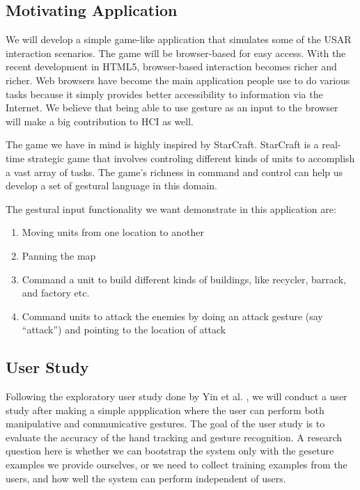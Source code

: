 \subsection{Motivating Application}
We will develop a simple game-like application that simulates some of the USAR
interaction scenarios. The game will be browser-based for easy access. With the
recent development in HTML5, browser-based interaction becomes richer and
richer. Web browsers have become the main application people use to do various
tasks because it simply provides better accessibility to information via the
Internet. We believe that being able to use gesture as an input to the browser
will make a big contribution to HCI as well.

The game we have in mind is highly inspired by StarCraft. StarCraft is a
real-time strategic game that involves controling different kinds of units to
accomplish a vast array of tasks. The game's richness in command
and control can help us develop a set of gestural language in this domain.

The gestural input functionality we want demonstrate in this application are:

\begin{enumerate}
  \item Moving units from one location to another
  \item Panning the map
  \item Command a unit to build different kinds of buildings, like recycler,
  barrack, and factory etc.
  \item Command units to attack the enemies by doing an attack gesture (say
  ``attack'') and pointing to the location of attack
\end{enumerate}

\subsection{User Study}\label{sec:userStudy}
Following the exploratory user study done by Yin et al. \cite{yin10}, we will
conduct a user study after making a simple appplication where the user can
perform both manipulative and communicative gestures. The goal of the user study
is to evaluate the accuracy of the hand tracking and gesture recognition. A
research question here is whether we can bootstrap the system only with the
geseture examples we provide ourselves, or we need to collect training examples
from the users, and how well the system can perform independent of users.

